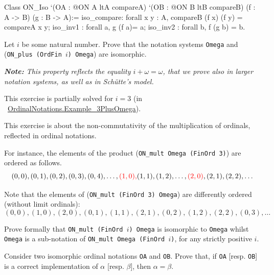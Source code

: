 \label{types:ON-iso} 
\begin{Coqsrc}
Class  ON_Iso 
       `(OA : @ON A ltA compareA)
       `(OB : @ON B ltB  compareB)
       (f : A -> B)
       (g : B -> A):=
  {
  iso_compare: forall x y : A, 
      compareB (f x) (f y) = compareA x y;
  iso_inv1 : forall a, g (f a)= a;
  iso_inv2 : forall b, f (g b) = b}.
\end{Coqsrc}


\begin{exercise}
Let $i$ be some natural number. Prove that the notation systems 
\texttt{Omega} and (\texttt{ON\_plus (OrdFin $i$) Omega}) are isomorphic.

{\it \textbf{Note:} This property reflects the equality $i+\omega=\omega$, that we prove also in larger notation systems, as well as in Schütte's model.}

This exercise is partially solved for $i=3$ (in ~\href{../theories/html/hydras.OrdinalNotations.Example_3PlusOmega.html}{OrdinalNotations.Example\_3PlusOmega}).

\end{exercise}

\label{exo:ON-mult}
\begin{project}

This exercise is about the non-commutativity of the multiplication of ordinals, reflected in ordinal notations.

For instance, the
elements of the product (\texttt{ON\_mult Omega (FinOrd 3)}) are ordered as follows.
\[(0,0),(0,1),(0,2),(0,3),(0,4),\dots,{\color{red}(1,0),} (1,1),(1,2),\dots, {\color{red}(2,0)},(2,1),(2,2),\dots\]

Note that the elements of  (\texttt{ON\_mult (FinOrd 3) Omega}) are differently ordered (without limit ordinals):
\[(0,0),(1,0),(2,0),(0,1),(1,1),(2,1),(0,2),(1,2),(2,2),(0,3),\dots\]


Prove formally  that \texttt{ON\_mult (FinOrd $i$) Omega} is isomorphic to
\texttt{Omega}  whilst
\texttt{Omega}  is a sub-notation of \texttt{ON\_mult Omega (FinOrd $i$)},
for any strictly positive $i$.
\end{project}

\begin{project}
Consider two isomorphic ordinal notations \texttt{OA} and \texttt{OB}.
Prove that, if \texttt{OA} [resp. \texttt{OB}] is a correct implementation 
of $\alpha$ [resp. $\beta$], then $\alpha=\beta$.
\end{project}


